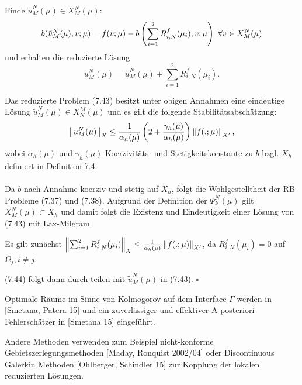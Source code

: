 Finde $\tilde{u}_M^N(\mu) \in X_M^N(\mu)$:
\begin{align}
b(\tilde{u}_M^N(\mu),v;\mu) = f(v;\mu) - b\left( \sum_{i=1}^2 R_{i,N}^f(\mu_i),v;\mu\right) ~\forall v\in X_M^N(\mu)
\end{align}
und erhalten die reduzierte Lösung
\[
u_M^N(\mu) = \tilde{u}_M^N(\mu) + \sum_{i=1}^2 R_{i,N}^f(\mu_i).
\]

Das reduzierte Problem (7.43) besitzt unter obigen Annahmen eine eindeutige Lösung $\tilde{u}_M^N(\mu)\in X_N^M(\mu)$ und es gilt die folgende Stabilitätsabschätzung:
\begin{align}
\left\Vert u_M^N(\mu)\right\Vert_X \le \frac{1}{\alpha_h(\mu)} \left( 2 + \frac{\gamma_h(\mu)}{\alpha_h(\mu)}\right) \left\Vert f(.;\mu)\right\Vert_{X'},
\end{align}
wobei $\alpha_h(\mu)$ und $\gamma_h(\mu)$ Koerzivitäts- und Stetigkeitskonstante zu $b$ bzgl. $X_h$ definiert in Definition 7.4.\\

\\
Da $b$ nach Annahme koerziv und stetig auf $X_h$, folgt die Wohlgestelltheit der RB-Probleme (7.37) und (7.38).
Aufgrund der Definition der $\Psi_k^N(\mu)$ gilt $X_M^N(\mu)\subset X_h$ und damit folgt die Existenz und Eindeutigkeit einer Lösung von (7.43) mit Lax-Milgram.

Es gilt zunächst $\left\Vert\sum_{i=1}^2 R_{i,N}^f(\mu_i)\right\Vert_X \le \frac{1}{\alpha_h(\mu)} \left\Vert f(.;\mu)\right\Vert_{X'}$, da $R_{i,N}^f(\mu_i) = 0$ auf $\Omega_j, i\neq j$.

(7.44) folgt dann durch teilen mit $\tilde{u}_M^N(\mu)$ in (7.43).
\hfill $\square$

Optimale Räume im Sinne von Kolmogorov auf dem Interface $\Gamma$ werden in [Smetana, Patera 15] und ein zuverlässiger und effektiver A posteriori Fehlerschätzer in [Smetana 15] eingeführt.

Andere Methoden verwenden zum Beispiel nicht-konforme Gebietszerlegungsmethoden [Maday, Ronquist 2002/04] oder Discontinuous Galerkin Methoden [Ohlberger, Schindler 15] zur Kopplung der lokalen reduzierten Lösungen.













 



\cleardoubleoddemptypage

 